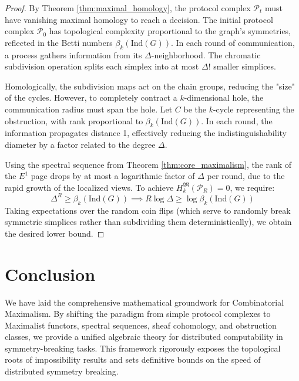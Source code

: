 \begin{proof}
By Theorem \ref{thm:maximal_homology}, the protocol complex $\mathcal{P}_t$ must have vanishing maximal homology to reach a decision. The initial protocol complex $\mathcal{P}_0$ has topological complexity proportional to the graph's symmetries, reflected in the Betti numbers $\beta_k(\text{Ind}(G))$.
In each round of communication, a process gathers information from its $\Delta$-neighborhood. The chromatic subdivision operation splits each simplex into at most $\Delta!$ smaller simplices.

Homologically, the subdivision maps act on the chain groups, reducing the "size" of the cycles. However, to completely contract a $k$-dimensional hole, the communication radius must span the hole. 
Let $C$ be the $k$-cycle representing the obstruction, with rank proportional to $\beta_k(\text{Ind}(G))$. In each round, the information propagates distance 1, effectively reducing the indistinguishability diameter by a factor related to the degree $\Delta$.

Using the spectral sequence from Theorem \ref{thm:core_maximalism}, the rank of the $E^1$ page drops by at most a logarithmic factor of $\Delta$ per round, due to the rapid growth of the localized views.
To achieve $H_k^{\mathfrak{M}}(\mathcal{P}_R) = 0$, we require:
\[
\Delta^R \ge \beta_k(\text{Ind}(G)) \implies R \log \Delta \ge \log \beta_k(\text{Ind}(G))
\]
Taking expectations over the random coin flips (which serve to randomly break symmetric simplices rather than subdividing them deterministically), we obtain the desired lower bound.
\end{proof}

\section{Conclusion}
We have laid the comprehensive mathematical groundwork for Combinatorial Maximalism. By shifting the paradigm from simple protocol complexes to Maximalist functors, spectral sequences, sheaf cohomology, and obstruction classes, we provide a unified algebraic theory for distributed computability in symmetry-breaking tasks. This framework rigorously exposes the topological roots of impossibility results and sets definitive bounds on the speed of distributed symmetry breaking.
